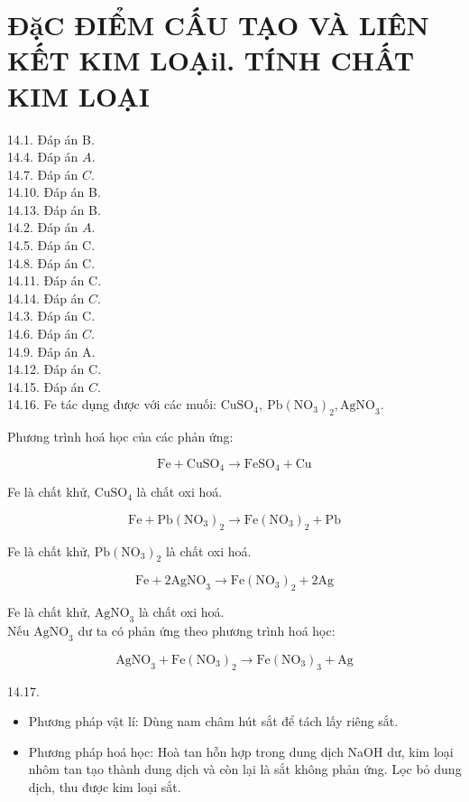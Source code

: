 \documentclass[10pt]{article}
\begin{document}
\section*{ĐặC ĐIỂM CẤU TẠO VÀ LIÊN KẾT KIM LOẠil. TÍNH CHẤT KIM LOẠI}
14.1. Đáp án B.\\
14.4. Đáp án $A$.\\
14.7. Đáp án $C$.\\
14.10. Đáp án B.\\
14.13. Đáp án B.\\
14.2. Đáp án $A$.\\
14.5. Đáp án C.\\
14.8. Đáp án C.\\
14.11. Đáp án C.\\
14.14. Đáp án $C$.\\
14.3. Đáp án C.\\
14.6. Đáp án $C$.\\
14.9. Đáp án A.\\
14.12. Đáp án C.\\
14.15. Đáp án $C$.\\
14.16. Fe tác dụng được với các muối: $\mathrm{CuSO}_{4}, \mathrm{~Pb}\left(\mathrm{NO}_{3}\right)_{2}, \mathrm{AgNO}_{3}$.

Phương trình hoá học của các phản ứng:

$$
\mathrm{Fe}+\mathrm{CuSO}_{4} \rightarrow \mathrm{FeSO}_{4}+\mathrm{Cu}
$$

Fe là chất khử, $\mathrm{CuSO}_{4}$ là chất oxi hoá.

$$
\mathrm{Fe}+\mathrm{Pb}\left(\mathrm{NO}_{3}\right)_{2} \rightarrow \mathrm{Fe}\left(\mathrm{NO}_{3}\right)_{2}+\mathrm{Pb}
$$

Fe là chất khử, $\mathrm{Pb}\left(\mathrm{NO}_{3}\right)_{2}$ là chất oxi hoá.

$$
\mathrm{Fe}+2 \mathrm{AgNO}_{3} \rightarrow \mathrm{Fe}\left(\mathrm{NO}_{3}\right)_{2}+2 \mathrm{Ag}
$$

Fe là chất khử, $\mathrm{AgNO}_{3}$ là chất oxi hoá.\\
Nếu $\mathrm{AgNO}_{3}$ dư ta có phản ứng theo phương trình hoá học:

$$
\mathrm{AgNO}_{3}+\mathrm{Fe}\left(\mathrm{NO}_{3}\right)_{2} \rightarrow \mathrm{Fe}\left(\mathrm{NO}_{3}\right)_{3}+\mathrm{Ag}
$$

14.17.

\begin{itemize}
  \item Phương pháp vật lí: Dùng nam châm hút sắt để tách lấy riêng sắt.
  \item Phương pháp hoá học: Hoà tan hỗn hợp trong dung dịch NaOH dư, kim loại nhôm tan tạo thành dung dịch và còn lại là sắt không phản ứng. Lọc bỏ dung dịch, thu được kim loại sắt.
\end{itemize}
\end{document}
